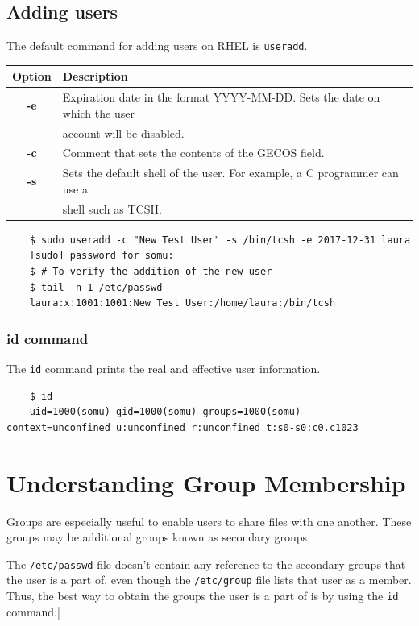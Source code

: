 \documentclass{report}
\begin{document}
	\subsection{Adding users}
	The default command for adding users on RHEL is \verb|useradd|. 
	
	\begin{tabular}{cl}
		\toprule 
		\textbf{Option} &\textbf{Description} \\
		\midrule
		\textbf{-e} &Expiration date in the format YYYY-MM-DD. Sets the date on which the user \\&account will be disabled. \\
		\textbf{-c} &Comment that sets the contents of the GECOS field. \\
		\textbf{-s} &Sets the default shell of the user. For example, a C programmer can use a \\&shell such as TCSH. \\		
		\bottomrule		
	\end{tabular}

	\begin{verbatim}
	$ sudo useradd -c "New Test User" -s /bin/tcsh -e 2017-12-31 laura
	[sudo] password for somu: 
	$ # To verify the addition of the new user
	$ tail -n 1 /etc/passwd
	laura:x:1001:1001:New Test User:/home/laura:/bin/tcsh
	\end{verbatim}

	\subsubsection{id command}
	The \verb|id| command prints the real and effective user information. 
	
	\begin{verbatim}
	$ id
	uid=1000(somu) gid=1000(somu) groups=1000(somu) context=unconfined_u:unconfined_r:unconfined_t:s0-s0:c0.c1023
	\end{verbatim}

	\section{Understanding Group Membership}
	Groups are especially useful to enable users to share files with one another. These groups may be additional groups known as secondary groups. 
	
	The \verb|/etc/passwd| file doesn't contain any reference to the secondary groups that the user is a part of, even though the \verb|/etc/group| file lists that user as a member. Thus, the best way to obtain the groups the user is a part of is by using the \verb|id| command.|
	
\end{document}
